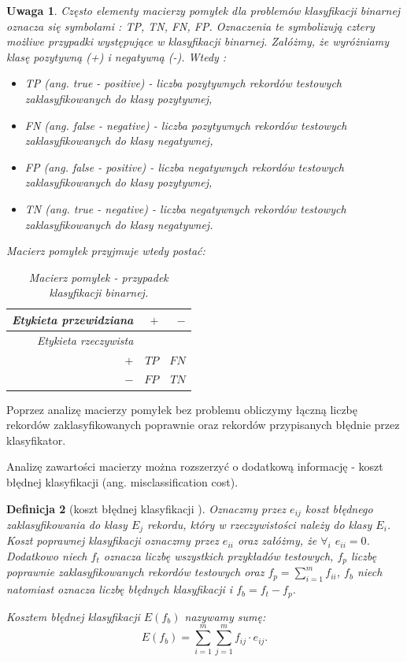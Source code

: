 \documentclass[12pt,a4paper]{report}
\newtheorem{df}{Definicja}[chapter]
\newtheorem{uwaga}[df]{Uwaga}
\begin{document}
\begin{uwaga}{\citep[Sec 4.8.1]{edmia}}
Często elementy macierzy pomyłek dla problemów klasyfikacji binarnej oznacza się symbolami : TP, TN, FN, FP. Oznaczenia te symbolizują cztery możliwe przypadki występujące w klasyfikacji binarnej. Załóżmy, że wyróżniamy klasę pozytywną (+) i negatywną (-). Wtedy :
\begin{itemize}
\item TP (ang. true - positive) - liczba pozytywnych rekordów testowych zaklasyfikowanych do klasy pozytywnej,
\item FN (ang. false - negative) - liczba pozytywnych rekordów testowych zaklasyfikowanych do klasy negatywnej,
\item FP (ang. false - positive) - liczba negatywnych rekordów testowych zaklasyfikowanych do klasy pozytywnej,
\item TN (ang. true - negative) - liczba negatywnych rekordów testowych zaklasyfikowanych do klasy negatywnej.
\end{itemize}
Macierz pomyłek przyjmuje wtedy postać:
\begin{table}[H]
\begin{center}
\begin{tabular}{|r|r|r|} \hline
Etykieta przewidziana & $+$ & $-$\\
\hline
Etykieta rzeczywista & &  \\
\hline 
$+$ & $TP$ & $FN$ \\
\hline
$-$ & $FP$ & $TN$  \\
\hline
\end{tabular}
\end{center}
\caption{Macierz pomyłek - przypadek klasyfikacji binarnej.}
\label{tabelka}
\end{table}
\end{uwaga}
Poprzez analizę macierzy pomyłek bez problemu obliczymy łączną liczbę rekordów zaklasyfikowanych poprawnie oraz rekordów przypisanych błędnie przez klasyfikator. 

Analizę zawartości macierzy można rozszerzyć o dodatkową informację - koszt błędnej klasyfikacji (ang. misclassification cost).
\begin{df}[koszt błędnej klasyfikacji {\citep[Sec 4.8.1]{edmia}}]
Oznaczmy przez $e_{ij}$ koszt błędnego zaklasyfikowania do klasy $E_j$ rekordu, który w rzeczywistości należy do klasy $E_i$.
Koszt poprawnej klasyfikacji oznaczmy przez $e_{ii}$ oraz załóżmy, że $\forall_{i}$ $ e_{ii} = 0$.
Dodatkowo niech $f_{t}$ oznacza liczbę wszystkich przykładów testowych, $f_{p}$ liczbę poprawnie zaklasyfikowanych rekordów testowych oraz $f_{p} = \sum_{i=1}^m f_{ii}$, $f_{b}$ niech natomiast oznacza liczbę błędnych klasyfikacji i $f_{b} = f_{t} - f_{p}$.

Kosztem błędnej klasyfikacji $E(f_{b})$ nazywamy sumę:
$$
E(f_{b}) = \sum_{i=1}^m \sum_{j=1}^m f_{ij} \cdot e_{ij}.
$$
\end{df}
\end{document}
